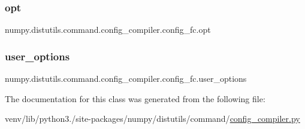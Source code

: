 \subsubsection{\texorpdfstring{opt}{opt}}
{\footnotesize\ttfamily numpy.\+distutils.\+command.\+config\+\_\+compiler.\+config\+\_\+fc.\+opt}

\mbox{\label{classnumpy_1_1distutils_1_1command_1_1config__compiler_1_1config__fc_a5e10c0bf4e3cef7231dd5bf24b89ab65}} 
\subsubsection{\texorpdfstring{user\+\_\+options}{user\_options}}
{\footnotesize\ttfamily numpy.\+distutils.\+command.\+config\+\_\+compiler.\+config\+\_\+fc.\+user\+\_\+options\hspace{0.3cm}{\ttfamily [static]}}



The documentation for this class was generated from the following file\+:\begin{DoxyCompactItemize}
\item 
venv/lib/python3./site-\/packages/numpy/distutils/command/\hyperlink{config__compiler_8py}{config\+\_\+compiler.\+py}\end{DoxyCompactItemize}
